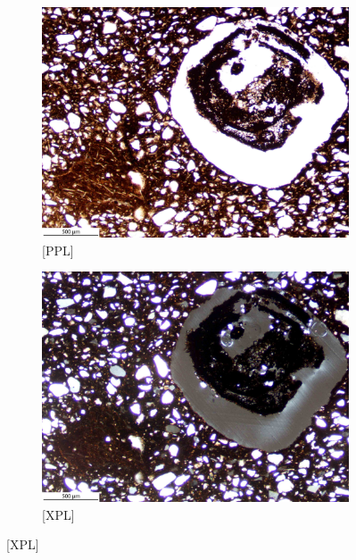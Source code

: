 \documentclass[a4paper]{article}
\begin{document}
\begin{figure}[H]
	\centering
	\begin{subfigure}[t]{.49\textwidth}
		\includegraphics[width=\textwidth]{ThinSections/52-1_4x_PPL.jpg}
		\caption{[PPL]}
	\end{subfigure}\hspace{.5em}\hfill
	\begin{subfigure}[t]{.49\textwidth}
		\includegraphics[width=\textwidth]{ThinSections/52-1_4x_XPL.jpg}
		\caption{[XPL]}
	\end{subfigure}

\end{figure}
\end{document}
